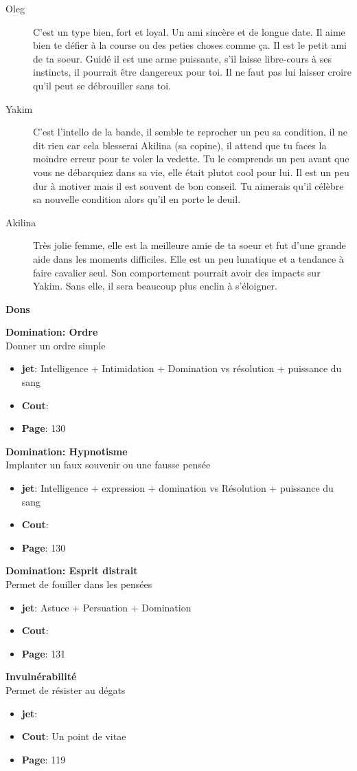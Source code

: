 \documentclass[oneside,12pt]{book}
\newcommand\don[5]{
\textbf{#1} \\
#2
\begin{itemize}
\item{ \textbf{jet}: #3}
\item{ \textbf{Cout}: #4}
\item{ \textbf{Page}: #5}
\end{itemize}
\vspace{0.5cm}
}
\begin{document}
\begin{flushleft}
\begin{description}
{}
\end{description}
\begin{description}
\item[Oleg]{C'est un type bien, fort et loyal. Un ami sincère et de longue date. Il aime bien te défier à la course ou des peties choses comme ça. Il est le petit ami de ta soeur. Guidé il est une arme puissante, s'il laisse libre-cours à ses instincts, il pourrait être dangereux pour toi. Il ne faut pas lui laisser croire qu'il peut se débrouiller sans toi.}
\item[Yakim]{C'est l'intello de la bande, il semble te reprocher un peu sa condition, il ne dit rien car cela blesserai Akilina (sa copine), il attend que tu faces la moindre erreur pour te voler la vedette. Tu le comprends un peu avant que vous ne débarquiez dans sa vie, elle était plutot cool pour lui. Il est un peu dur à motiver mais il est souvent de bon conseil. Tu aimerais qu'il célèbre sa nouvelle condition alors qu'il en porte le deuil. }
\item[Akilina]{Très jolie femme, elle est la meilleure amie de ta soeur et fut d'une grande aide dans les moments difficiles. Elle est un peu lunatique et a tendance à faire cavalier seul. Son comportement pourrait avoir des impacts sur Yakim. Sans elle, il sera beaucoup plus enclin à s'éloigner.}
\end{description}
 
\clearpage
\textbf{\large Dons}
\vspace{0.5cm}


\don{Domination: Ordre}{Donner un ordre simple}{Intelligence + Intimidation + Domination vs résolution + puissance du sang}{}{130}
\don{Domination: Hypnotisme}{Implanter un faux souvenir ou une fausse pensée}{Intelligence  + expression + domination vs Résolution + puissance du sang}{}{130}
\don{Domination: Esprit distrait}{Permet de fouiller dans les pensées}{Astuce + Persuation + Domination}{}{131}
\don{Invulnérabilité}{Permet de résister au dégats}{}{Un point de vitae}{119}

\clearpage


\end{flushleft}
\end{document}
